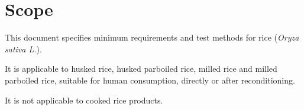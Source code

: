 \section{Scope}

This document specifies minimum requirements and test methods for rice (\textit{Oryza sativa L.}).

It is applicable to husked rice, husked parboiled rice, milled rice and milled parboiled rice, suitable for human consumption, directly or after reconditioning.

It is not applicable to cooked rice products.
